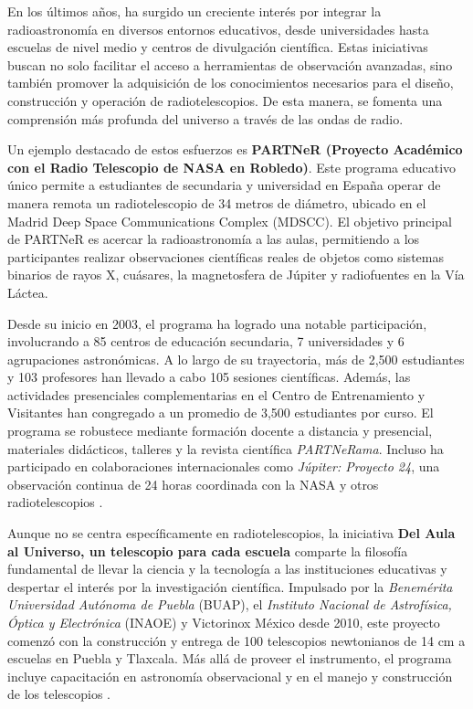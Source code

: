 En los últimos años, ha surgido un creciente interés por integrar la
radioastronomía en diversos entornos educativos, desde universidades hasta
escuelas de nivel medio y centros de divulgación científica.
Estas iniciativas buscan no solo facilitar el acceso a herramientas de
observación avanzadas, sino también promover la adquisición de los
conocimientos necesarios para el diseño, construcción y operación de
radiotelescopios.
De esta manera, se fomenta una comprensión más profunda del universo a través
de las ondas de radio.

Un ejemplo destacado de estos esfuerzos es \textbf{PARTNeR (Proyecto Académico
con el Radio Telescopio de NASA en Robledo)}.
Este programa educativo único permite a estudiantes de secundaria y universidad
en España operar de manera remota un radiotelescopio de 34 metros de diámetro,
ubicado en el Madrid Deep Space Communications Complex (MDSCC).
El objetivo principal de PARTNeR es acercar la radioastronomía a las aulas,
permitiendo a los participantes realizar observaciones científicas reales de
objetos como sistemas binarios de rayos X, cuásares, la magnetosfera de Júpiter
y radiofuentes en la Vía Láctea.

Desde su inicio en 2003, el programa ha logrado una notable participación,
involucrando a 85 centros de educación secundaria, 7 universidades y 6
agrupaciones astronómicas.
A lo largo de su trayectoria, más de 2,500 estudiantes y 103 profesores han
llevado a cabo 105 sesiones científicas.
Además, las actividades presenciales complementarias en el Centro de
Entrenamiento y Visitantes han congregado a un promedio de 3,500 estudiantes
por curso.
El programa se robustece mediante formación docente a distancia y presencial,
materiales didácticos, talleres y la revista científica \textit{PARTNeRama}.
Incluso ha participado en colaboraciones internacionales como \textit{Júpiter:
Proyecto 24}, una observación continua de 24 horas coordinada con la NASA
y otros radiotelescopios \cite{Vaquerizo2010}.

Aunque no se centra específicamente en radiotelescopios, la iniciativa
\textbf{Del Aula al Universo, un telescopio para cada escuela} comparte la
filosofía fundamental de llevar la ciencia y la tecnología a las instituciones
educativas y despertar el interés por la investigación científica.
Impulsado por la \emph{Benemérita Universidad Autónoma de Puebla} (BUAP), el
\emph{Instituto Nacional de Astrofísica, Óptica y Electrónica} (INAOE)
y Victorinox México desde 2010, este proyecto comenzó con la construcción
y entrega de 100 telescopios newtonianos de 14 cm a escuelas en Puebla
y Tlaxcala.
Más allá de proveer el instrumento, el programa incluye capacitación en
astronomía observacional y en el manejo y construcción de los telescopios
\cite{AIDCT2011}.

